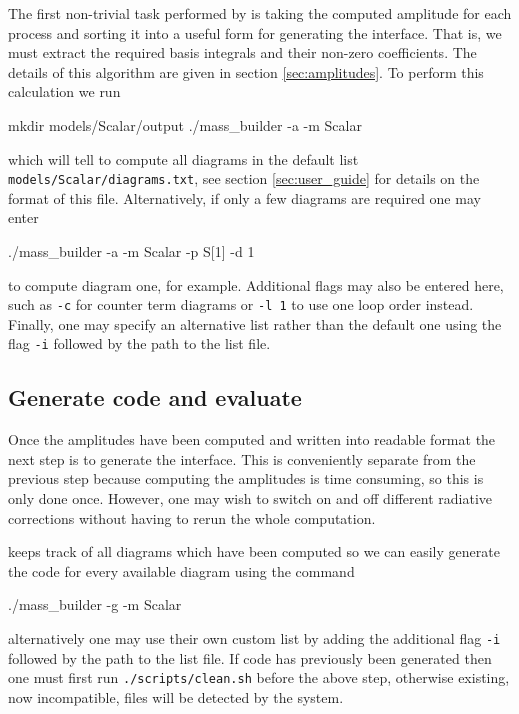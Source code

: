 The first non-trivial task performed by \mb is taking the computed amplitude for each process and sorting it into a useful form for generating the \tsil interface.  That is, we must extract the required basis integrals and their non-zero coefficients.  The details of this algorithm are given in section \ref{sec:amplitudes}.  To perform this calculation we run
\begin{lstterm}
mkdir models/Scalar/output
./mass_builder -a -m Scalar
\end{lstterm}
which will tell \mb to compute all diagrams in the default list \lstinline{models/Scalar/diagrams.txt}, see section \ref{sec:user_guide} for details on the format of this file.  Alternatively, if only a few diagrams are required one may enter
\begin{lstterm}
./mass_builder -a -m Scalar -p S[1] -d 1
\end{lstterm}
to compute diagram one, for example.  Additional flags may also be entered here, such as \lstinline{-c} for counter term diagrams or \lstinline{-l 1} to use one loop order instead.  Finally, one may specify an alternative list rather than the default one using the flag \lstinline{-i} followed by the path to the list file.


\subsection{Generate code and evaluate}

Once the amplitudes have been computed and written into \mb readable format the next step is to generate the \tsil interface.  This is conveniently separate from the previous step because computing the amplitudes is time consuming, so this is only done once.  However, one may wish to switch on and off different radiative corrections without having to rerun the whole computation.

\mb keeps track of all diagrams which have been computed so we can easily generate the code for every available diagram using the command
\begin{lstterm}
./mass_builder -g -m Scalar
\end{lstterm}
alternatively one may use their own custom list by adding the additional flag \lstinline{-i} followed by the path to the list file.  If code has previously been generated then one must first run \lstinline{./scripts/clean.sh} before the above step, otherwise existing, now incompatible, files will be detected by the \cmake system.

